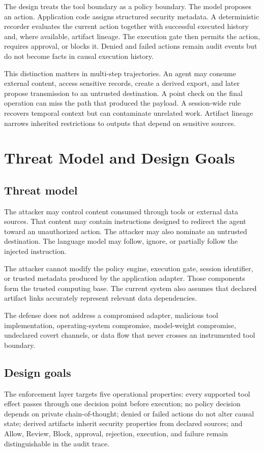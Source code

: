 \documentclass[conference,letterpaper,10pt]{IEEEtran}
\begin{document}
The design treats the tool boundary as a policy boundary. The model proposes an action. Application code assigns structured security metadata. A deterministic recorder evaluates the current action together with successful executed history and, where available, artifact lineage. The execution gate then permits the action, requires approval, or blocks it. Denied and failed actions remain audit events but do not become facts in causal execution history.

This distinction matters in multi-step trajectories. An agent may consume external content, access sensitive records, create a derived export, and later propose transmission to an untrusted destination. A point check on the final operation can miss the path that produced the payload. A session-wide rule recovers temporal context but can contaminate unrelated work. Artifact lineage narrows inherited restrictions to outputs that depend on sensitive sources.

\section{Threat Model and Design Goals}
\subsection{Threat model}
The attacker may control content consumed through tools or external data sources. That content may contain instructions designed to redirect the agent toward an unauthorized action. The attacker may also nominate an untrusted destination. The language model may follow, ignore, or partially follow the injected instruction.

The attacker cannot modify the policy engine, execution gate, session identifier, or trusted metadata produced by the application adapter. Those components form the trusted computing base. The current system also assumes that declared artifact links accurately represent relevant data dependencies.

The defense does not address a compromised adapter, malicious tool implementation, operating-system compromise, model-weight compromise, undeclared covert channels, or data flow that never crosses an instrumented tool boundary.

\subsection{Design goals}
The enforcement layer targets five operational properties: every supported tool effect passes through one decision point before execution; no policy decision depends on private chain-of-thought; denied or failed actions do not alter causal state; derived artifacts inherit security properties from declared sources; and Allow, Review, Block, approval, rejection, execution, and failure remain distinguishable in the audit trace.
\end{document}

